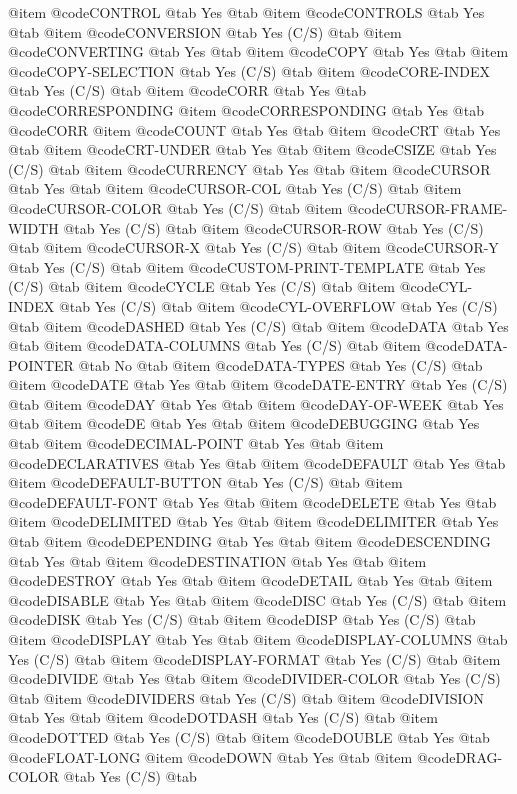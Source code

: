 @item @code{CONTROL} @tab Yes @tab
@item @code{CONTROLS} @tab Yes @tab
@item @code{CONVERSION} @tab Yes	(C/S) @tab
@item @code{CONVERTING} @tab Yes @tab
@item @code{COPY} @tab Yes @tab
@item @code{COPY-SELECTION} @tab Yes	(C/S) @tab
@item @code{CORE-INDEX} @tab Yes (C/S) @tab
@item @code{CORR} @tab Yes @tab @code{CORRESPONDING}
@item @code{CORRESPONDING} @tab Yes @tab @code{CORR}
@item @code{COUNT} @tab Yes @tab
@item @code{CRT} @tab Yes @tab
@item @code{CRT-UNDER} @tab Yes @tab
@item @code{CSIZE} @tab Yes	(C/S) @tab
@item @code{CURRENCY} @tab Yes @tab
@item @code{CURSOR} @tab Yes @tab
@item @code{CURSOR-COL} @tab Yes	(C/S) @tab
@item @code{CURSOR-COLOR} @tab Yes	(C/S) @tab
@item @code{CURSOR-FRAME-WIDTH} @tab Yes	(C/S) @tab
@item @code{CURSOR-ROW} @tab Yes	(C/S) @tab
@item @code{CURSOR-X} @tab Yes	(C/S) @tab
@item @code{CURSOR-Y} @tab Yes	(C/S) @tab
@item @code{CUSTOM-PRINT-TEMPLATE} @tab Yes	(C/S) @tab
@item @code{CYCLE} @tab Yes	(C/S) @tab
@item @code{CYL-INDEX} @tab Yes (C/S) @tab
@item @code{CYL-OVERFLOW} @tab Yes (C/S) @tab
@item @code{DASHED} @tab Yes	(C/S) @tab
@item @code{DATA} @tab Yes @tab
@item @code{DATA-COLUMNS} @tab Yes	(C/S) @tab
@item @code{DATA-POINTER} @tab No @tab
@item @code{DATA-TYPES} @tab Yes	(C/S) @tab
@item @code{DATE} @tab Yes @tab
@item @code{DATE-ENTRY} @tab Yes	(C/S) @tab
@item @code{DAY} @tab Yes @tab
@item @code{DAY-OF-WEEK} @tab Yes @tab
@item @code{DE} @tab Yes @tab
@item @code{DEBUGGING} @tab Yes @tab
@item @code{DECIMAL-POINT} @tab Yes @tab
@item @code{DECLARATIVES} @tab Yes @tab
@item @code{DEFAULT} @tab Yes @tab
@item @code{DEFAULT-BUTTON} @tab Yes	(C/S) @tab
@item @code{DEFAULT-FONT} @tab Yes @tab
@item @code{DELETE} @tab Yes @tab
@item @code{DELIMITED} @tab Yes @tab
@item @code{DELIMITER} @tab Yes @tab
@item @code{DEPENDING} @tab Yes @tab
@item @code{DESCENDING} @tab Yes @tab
@item @code{DESTINATION} @tab Yes @tab
@item @code{DESTROY} @tab Yes @tab
@item @code{DETAIL} @tab Yes @tab
@item @code{DISABLE} @tab Yes @tab
@item @code{DISC} @tab Yes	(C/S) @tab
@item @code{DISK} @tab Yes	(C/S) @tab
@item @code{DISP} @tab Yes (C/S) @tab
@item @code{DISPLAY} @tab Yes @tab
@item @code{DISPLAY-COLUMNS} @tab Yes	(C/S) @tab
@item @code{DISPLAY-FORMAT} @tab Yes	(C/S) @tab
@item @code{DIVIDE} @tab Yes @tab
@item @code{DIVIDER-COLOR} @tab Yes	(C/S) @tab
@item @code{DIVIDERS} @tab Yes	(C/S) @tab
@item @code{DIVISION} @tab Yes @tab
@item @code{DOTDASH} @tab Yes	(C/S) @tab
@item @code{DOTTED} @tab Yes	(C/S) @tab
@item @code{DOUBLE} @tab Yes @tab @code{FLOAT-LONG}
@item @code{DOWN} @tab Yes @tab
@item @code{DRAG-COLOR} @tab Yes	(C/S) @tab
